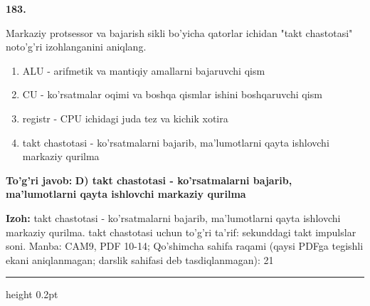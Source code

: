 \documentclass[10pt,a4paper]{article}
\begin{document}
{\bfseries\sffamily\color{ink} 183.}
\par
Markaziy protsessor va bajarish sikli bo'yicha qatorlar ichidan "takt chastotasi" noto'g'ri izohlanganini aniqlang.
\begin{enumerate}[label=\Alph*),leftmargin=9mm]
\item ALU - arifmetik va mantiqiy amallarni bajaruvchi qism
\item CU - ko'rsatmalar oqimi va boshqa qismlar ishini boshqaruvchi qism
\item registr - CPU ichidagi juda tez va kichik xotira
\item takt chastotasi - ko'rsatmalarni bajarib, ma'lumotlarni qayta ishlovchi markaziy qurilma
\end{enumerate}
\begin{tcolorbox}[enhanced,breakable,colback=teal!4,colframe=teal!60!black,boxrule=0.45pt,arc=1.2mm,left=2.7mm,right=2.7mm,top=1.8mm,bottom=1.8mm,before skip=2mm,after skip=2mm]
{\bfseries\sffamily\color{teal}To'g'ri javob:} \textbf{D) takt chastotasi - ko'rsatmalarni bajarib, ma'lumotlarni qayta ishlovchi markaziy qurilma}
\par\smallskip
{\bfseries Izoh:} takt chastotasi - ko'rsatmalarni bajarib, ma'lumotlarni qayta ishlovchi markaziy qurilma. takt chastotasi uchun to'g'ri ta'rif: sekunddagi takt impulslar soni. Manba: CAM9, PDF 10-14; Qo'shimcha sahifa raqami (qaysi PDFga tegishli ekani aniqlanmagan; darslik sahifasi deb tasdiqlanmagan): 21
\end{tcolorbox}
\vspace{2mm}\hrule height 0.2pt\vspace{3mm}
\end{document}
